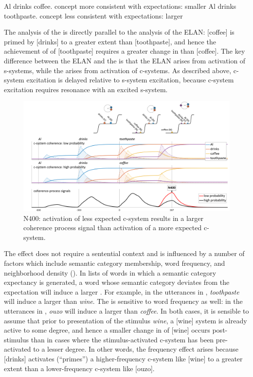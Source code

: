 \ea\label{ex:6:24}
\ea\label{ex:6:24a} Al drinks coffee. \break concept more consistent with expectations: smaller 
\ex\label{ex:6:24b} Al drinks toothpaste. \break concept less consistent with expectations: larger 
\z
\z

The analysis of the  is directly parallel to the analysis of the ELAN: [coffee] is primed by [drinks] to a greater extent than [toothpaste], and hence the achievement of  of [toothpaste] requires a greater change in  than [coffee]. The key difference between the ELAN and the  is that the ELAN arises from activation of s-systems, while the  arises from activation of c-systems. As described above, c-system excitation is delayed relative to s-system excitation, because c-system excitation requires resonance with an excited s-system.

  
\begin{figure}
\includegraphics[width=\textwidth]{figures/Tilsen-img143.png}
\caption{N400: activation of less expected c-system results in a larger coherence process signal than activation of a more expected c-system.}
\label{fig:6:24}
\end{figure}
 

The  effect does not require a sentential context and is influenced by a number of factors which include semantic category membership, word frequency, and neighborhood density (\citealt{KutasFedermeier2011,LauEtAl2008}). In lists of words in which a semantic category expectancy is generated, a word whose semantic category deviates from the expectation will induce a larger . For example, in the utterances in , \textit{toothpaste} will induce a larger  than \textit{wine}. The  is sensitive to word frequency as well: in the utterances in , \textit{ouzo} will induce a larger  than \textit{coffee}. In both cases, it is sensible to assume that prior to presentation of the stimulus \textit{wine}, a [wine] system is already active to some degree, and hence a smaller change in  of [wine] occurs post-stimulus than in cases where the stimulus-activated c-system has been pre-activated to a lesser degree. In other words, the frequency effect arises because [drinks] activates (“primes”) a higher-frequency c-system like [wine] to a greater extent than a lower-frequency c-system like [ouzo].


